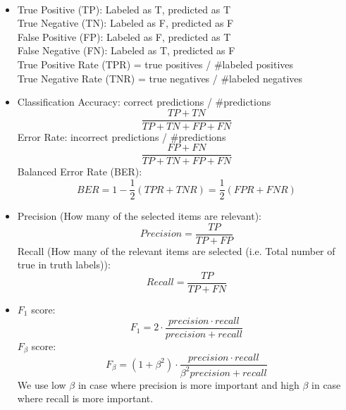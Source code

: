\documentclass[12pt]{article}
\newenvironment{concept}[1]{\begin{trivlist}
		\item[\hskip \labelsep {\bfseries #1}]}{\end{trivlist}}
\begin{document}
\begin{concept}{Classifier Evaluation}
	\
	\begin{itemize}
		\item {
			True Positive (TP): Labeled as T, predicted as T\\
			True Negative (TN): Labeled as F, predicted as F\\
			False Positive (FP): Labeled as F, predicted as T\\
			False Negative (FN): Labeled as T, predicted as F\\
			True Positive Rate (TPR) = true positives / \#labeled positives\\
			True Negative Rate (TNR) = true negatives / \#labeled negatives
		}
		\item {
			Classification Accuracy: correct predictions / \#predictions
			$$\frac{TP + TN}{TP + TN + FP + FN}$$
			Error Rate: incorrect predictions / \#predictions
			$$\frac{FP + FN}{TP + TN + FP + FN}$$
			Balanced Error Rate (BER): 
			$$BER = 1 - \frac{1}{2} (TPR + TNR) = \frac{1}{2} (FPR + FNR)$$
		}
		\item {
			Precision (How many of the selected items are relevant):
			$$Precision = \frac{TP}{TP + FP}$$
			Recall (How many of the relevant items are selected (i.e. Total number of true in truth labels)):
			$$Recall = \frac{TP}{TP + FN}$$
		}
		\item {
			$F_1$ score:
			$$F_1 = 2 \cdot \frac{precision \cdot recall}{precision + recall}$$
			$F_\beta$ score:
			$$F_\beta = (1+\beta^2) \cdot \frac{precision \cdot recall}{\beta^2 precision + recall}$$
			We use low $\beta$ in case where precision is more important and high $\beta$ in case where
			recall is more important.
		}
	\end{itemize}
\end{concept}
\end{document}
